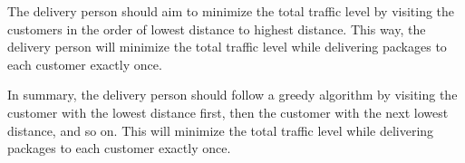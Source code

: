 \documentclass{article}%
\begin{document}
The delivery person should aim to minimize the total traffic level by visiting the customers in the order of lowest distance to highest distance. This way, the delivery person will minimize the total traffic level while delivering packages to each customer exactly once.

In summary, the delivery person should follow a greedy algorithm by visiting the customer with the lowest distance first, then the customer with the next lowest distance, and so on. This will minimize the total traffic level while delivering packages to each customer exactly once.\\\\%
\end{document}
